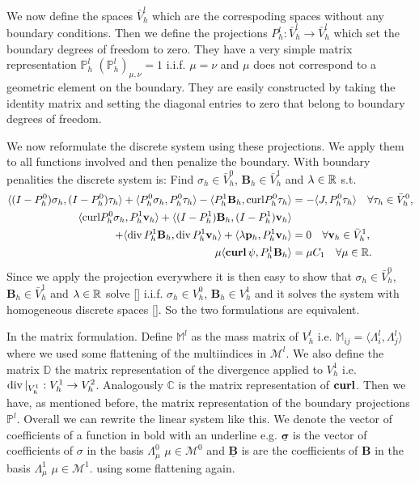 \documentclass[../master_thesis.tex]{subfiles}
\begin{document}
We now define the spaces $\bar{V}_h^l$ which are the correspoding spaces 
without any boundary conditions. Then we define the 
projections $P_h^l: \bar{V}_h^l \rightarrow \bar{V}_h^l$ which set 
the boundary degrees of freedom to zero. They have a very simple 
matrix representation $\mathbb{P}_h^l$ 
$(\mathbb{P}_h^l)_{\mu, \nu} = 1 $ i.i.f. $\mu = \nu$ and $\mu$ does not 
correspond to a geometric element on the boundary. They are easily constructed 
by taking the identity matrix and setting the diagonal entries to zero that 
belong to boundary degrees of freedom.

We now reformulate the discrete system using these projections. We apply them 
to all functions involved and then penalize the boundary.
With boundary penalities the discrete system is: Find $\sigma_h \in \bar{V}_h^0$, 
$\mathbf{B}_h \in \bar{V}^1_h$ and $\lambda \in \mathbb{R}$ s.t.
\begin{align*}
    \langle (I-P^0_h)\sigma_h, (I-P^0_h)\tau_h \rangle + \langle P^0_h \sigma_h, P^0_h\tau_h \rangle 
        - \langle P^1_h \mathbf{B}_h, \mathbf{\curl}P^0_h\tau_h \rangle 
    &=  -\langle J, P^0_h \tau_h \rangle \quad \forall \tau_h \in \bar{V}_h^0, 
    \\ \langle \mathbf{\curl}P^0_h \sigma_h, P^1_h\mathbf{v}_h \rangle 
        + \langle (I-P^1_h)\mathbf{B}_h, (I-P^1_h)\mathbf{v}_h \rangle
    \\ \quad    + \langle \diver P^1_h\mathbf{B}_h, \diver P^1_h\mathbf{v}_h \rangle 
        + \langle \lambda \mathbf{p}_h, P^1_h\mathbf{v}_h \rangle 
    &= 0 \quad \forall \mathbf{v}_h \in \bar{V}^1_h, 
    \\ \mu \langle \bm{\curl} \psi, P^1_h \mathbf{B}_h \rangle &= \mu C_1 \quad \forall \mu \in \real.
\end{align*}
Since we apply the projection everywhere it is then easy to show that 
$\sigma_h \in \bar{V}_h^0$, 
$\mathbf{B}_h \in \bar{V}^1_h$ and $\lambda \in \mathbb{R}$ solve \ref{} 
i.i.f. $\sigma_h \in V_h^0$, $\mathbf{B}_h \in V^1_h$ 
and it solves the system with homogeneous discrete spaces \ref{}. 
So the two formulations are equivalent.

In the matrix formulation. Define $\mathbb{M}^l$ as the mass matrix 
of $V_h^l$ i.e. $\mathbb{M}_{ij} = \langle \Lambda^l_i , \Lambda^l_j \rangle$ 
where we used some flattening of the multiindices in $\mathcal{M}^l$. 
We also define the matrix $\mathbb{D}$ the matrix representation of the 
divergence applied to $V^1_h$ i.e. $\operatorname{div}|_{V^1_h}: V^1_h \rightarrow V^2_h$.
Analogously $\mathbb{C}$ is the matrix representation of $\veccurl$. Then 
we have, as mentioned before, the matrix representation of the boundary projections 
$\mathbb{P}^l$. Overall we can rewrite the linear system like this. 
We denote the vector of coefficients of a function in bold with an underline e.g. 
$\underline{\bm{\sigma} }$ is the vector of coefficients of $\sigma$ in 
the basis $\Lambda^0_\mu$ $\mu \in \mathcal{M}^0$ 
and $\underline{\mathbf{B}}$ is are the coefficients of $\mathbf{B}$ in the basis 
$\Lambda^1_\mu$ $\mu \in \mathcal{M}^1$.
using some flattening again.
\end{document}
